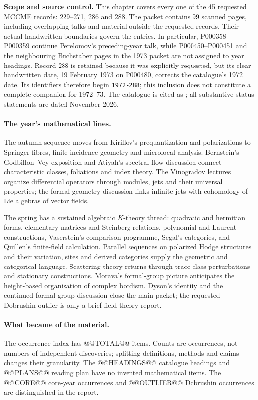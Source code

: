 \noindent\textbf{Scope and source control.}
This chapter covers every one of the 45 requested MCCME records: 229--271,
286 and 288.  The packet contains 99 scanned pages, including overlapping
talks and material outside the requested records.  Their actual handwritten
boundaries govern the entries.  In particular, P000358--P000359 continue
Perelomov's preceding-year talk, while P000450--P000451 and the neighbouring
Buchstaber pages in the 1973 packet are not assigned to year headings.
Record 288 is retained because it was explicitly requested, but its clear
handwritten date, 19 February 1973 on P000480, corrects the catalogue's 1972
date.  Its identifiers therefore begin \texttt{1972-288}; this inclusion does
not constitute a complete companion for 1972--73.  The catalogue is cited as
\citet{mccme2026gelfand}; all substantive status statements are dated November
2026.

\paragraph{The year's mathematical lines.}
The autumn sequence moves from Kirillov's prequantization and polarizations to
Springer fibres, finite incidence geometry and microlocal analysis.  Bernstein's
Godbillon--Vey exposition and Atiyah's spectral-flow discussion connect
characteristic classes, foliations and index theory.  The Vinogradov lectures
organize differential operators through modules, jets and their universal
properties; the formal-geometry discussion links infinite jets with
cohomology of Lie algebras of vector fields.

The spring has a sustained algebraic \(K\)-theory thread: quadratic and
hermitian forms, elementary matrices and Steinberg relations, polynomial and
Laurent constructions, Vaserstein's comparison programme, Segal's categories,
and Quillen's finite-field calculation.  Parallel sequences on polarized
Hodge structures and their variation, sites and derived categories supply the geometric
and categorical language.  Scattering theory returns through trace-class
perturbations and stationary constructions.  Morava's formal-group picture
anticipates the height-based organization of complex bordism.  Dyson's
identity and the continued formal-group discussion close the main packet;
the requested Dobrushin outlier is only a brief field-theory report.

\paragraph{What became of the material.}
The occurrence index has @@TOTAL@@ items.  Counts are occurrences, not numbers
of independent discoveries; splitting definitions, methods and claims changes
their granularity.  The @@HEADINGS@@ catalogue headings and @@PLANS@@ reading
plan have no invented mathematical items.  The @@CORE@@ core-year occurrences and @@OUTLIER@@
Dobrushin occurrences are distinguished in the report.

